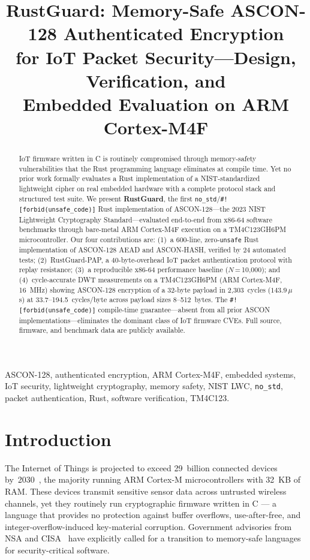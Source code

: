 \documentclass[anonymous]{ndss}
\title{RustGuard: Memory-Safe ASCON-128 Authenticated Encryption\\
       for IoT Packet Security---Design, Verification, and\\
       Embedded Evaluation on ARM Cortex-M4F}
\author{}
\newcommand{\code}[1]{\mbox{\texttt{#1}}}
\newcommand{\nstd}{\texttt{no\_std}}
\newcommand{\forbid}{\code{\#![forbid(unsafe\_code)]}}
\begin{document}
\maketitle

\begin{abstract}
IoT firmware written in C is routinely compromised through memory-safety
vulnerabilities that the Rust programming language eliminates at compile time.
Yet no prior work formally evaluates a Rust implementation of a NIST-standardized
lightweight cipher on real embedded hardware with a complete protocol stack and
structured test suite. We present \textbf{RustGuard}, the first
\nstd{}/\forbid{} Rust implementation of ASCON-128---the 2023 NIST Lightweight
Cryptography Standard---evaluated end-to-end from x86-64 software benchmarks
through bare-metal ARM Cortex-M4F execution on a TM4C123GH6PM microcontroller.
Our four contributions are: (1)~a 600-line, zero-\texttt{unsafe} Rust
implementation of ASCON-128 AEAD and ASCON-HASH, verified by 24 automated
tests; (2)~RustGuard-PAP, a 40-byte-overhead IoT packet authentication
protocol with replay resistance; (3)~a reproducible x86-64 performance
baseline ($N$\,=\,10{,}000); and (4)~cycle-accurate DWT measurements on a
TM4C123GH6PM (ARM Cortex-M4F, 16~MHz) showing ASCON-128 encryption of a
32-byte payload in 2{,}303~cycles ($143.9$\,$\mu$s) at 33.7--194.5~cycles/byte
across payload sizes 8--512~bytes. The \forbid{} compile-time
guarantee---absent from all prior ASCON implementations---eliminates the
dominant class of IoT firmware CVEs. Full source, firmware, and benchmark data
are publicly available.
\end{abstract}

\begin{IEEEkeywords}
ASCON-128, authenticated encryption, ARM Cortex-M4F, embedded systems,
IoT security, lightweight cryptography, memory safety, NIST LWC, \nstd{},
packet authentication, Rust, software verification, TM4C123.
\end{IEEEkeywords}

\section{Introduction}
\label{sec:intro}

The Internet of Things is projected to exceed 29~billion connected devices
by~2030~\cite{b1}, the majority running ARM Cortex-M microcontrollers with
32~KB of RAM. These devices transmit sensitive sensor data across untrusted
wireless channels, yet they routinely run cryptographic firmware written in C
--- a language that provides no protection against buffer overflows,
use-after-free, and integer-overflow-induced key-material corruption. Government
advisories from NSA and CISA~\cite{b16} have explicitly called for a transition
to memory-safe languages for security-critical software.
\end{document}
